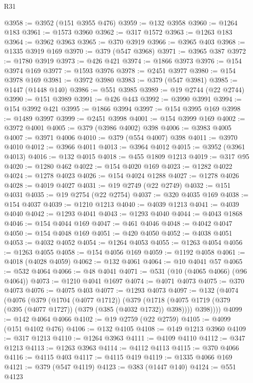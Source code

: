 \begin{lexlean}{R31}
\begin{coremodule}
@3958 := @3952 (@151 @3955 @476)
@3959 := @132 @3958
@3960 := @1264 @183
@3961 := @1573 @3960
@3962 := @317 @1572
@3963 := @1263 @183
@3964 := @3962 @3963
@3965 := @370 @3919
@3966 := @3965 @403
@3968 := @1335 @3919 @169
@3970 := @379 (@547 @3968)
@3971 := @3965 @387
@3972 := @1780 @3919
@3973 := @426 @421
@3974 := @1866 @3973
@3976 := @154 @3974 @169
@3977 := @1593 @3976
@3978 := @2451 @3977
@3980 := @154 @3978 @169
@3981 := @3972 @3980
@3983 := @379 (@547 @3981)
@3985 := @1447 (@1448 @140)
@3986 := @551 @3985
@3989 := @19 @2744 (@22 @2744)
@3990 := @151 @3989
@3991 := @426 @443
@3992 := @3990 @3991
@3994 := @154 @3992 @421
@3995 := @1866 @3994
@3997 := @154 @3995 @169
@3998 := @1489 @3997
@3999 := @2451 @3998
@4001 := @154 @3999 @169
@4002 := @3972 @4001
@4005 := @379 (@3986 @4002) @398
@4006 := @3983 @4005
@4007 := @3971 @4006
@4010 := @379 (@554 @4007) @398
@4011 := @3970 @4010
@4012 := @3966 @4011
@4013 := @3964 @4012
@4015 := @3952 (@3961 @4013)
@4016 := @132 @4015
@4018 := @455 @1809 @1213
@4019 := @317 @95
@4020 := @1280 @462
@4022 := @154 @4020 @169
@4023 := @1282 @4022
@4024 := @1278 @4023
@4026 := @154 @4024 @1288
@4027 := @1278 @4026
@4028 := @4019 @4027
@4031 := @19 @2749 (@22 @2749)
@4032 := @151 @4031
@4035 := @19 @2754 (@22 @2754)
@4037 := @320 @4035 @169
@4038 := @154 @4037
@4039 := @1210 @1213
@4040 := @4039 @1213
@4041 := @4039 @4040
@4042 := @1293 @4041
@4043 := @1293 @4040
@4044 := @4043 @1868
@4046 := @154 @4044 @169
@4047 := @461 @4046
@4048 := @4042 @4047
@4050 := @154 @4048 @169
@4051 := @420 @4050
@4052 := @4038 @4051
@4053 := @4032 @4052
@4054 := @1264 @4053
@4055 := @1263 @4054
@4056 := @1263 @4055
@4058 := @154 @4056 @169
@4059 := @1192 @4058
@4061 := @4018 (@4028 @4059)
@4062 := @132 @4061
@4064 := @10 @4041 @57
@4065 := @532 @4064
@4066 := @48 @4041
@4071 := @531 (@10 (@4065 @4066) (@96 @4064))
@4073 := @1210 @4041 @1697
@4074 := @4071 @4073
@4075 := @370 @4073
@4076 := @4075 @403
@4077 := @1293 @4073
@4097 := @132
    (@4074
      (@4076
        (@379
          (@1704 (@4077 @1712))
          (@379
            (@1718 (@4075 @1719 (@379 (@395 (@4077 @1727)) (@379 (@385 (@4032 @1732)) @398))))
            @398))))
@4099 := @142 @4064 @4066
@4102 := @19 @2759 (@22 @2759)
@4105 := @4099 (@151 @4102 @476)
@4106 := @132 @4105
@4108 := @149 @1213 @3960
@4109 := @317 @1213
@4110 := @1264 @3963
@4111 := @4109 @4110
@4112 := @347 @1213
@4113 := @1263 @3963
@4114 := @4112 @4113
@4115 := @370 @4066
@4116 := @4115 @403
@4117 := @4115 @419
@4119 := @1335 @4066 @169
@4121 := @379 (@547 @4119)
@4123 := @383 (@1447 @140)
@4124 := @551 @4123

\end{coremodule}
\end{lexlean}
